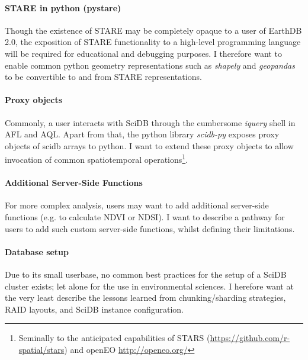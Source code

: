 \documentclass[letterpaper, parskip=half]{scrartcl}
\begin{document}
\paragraph{STARE in python (pystare)}
Though the existence of STARE may be completely opaque to a user of EarthDB 2.0, the exposition of STARE functionality to a high-level programming language will be required for educational and debugging purposes. I therefore want to enable common python geometry representations such as \textit{shapely} and \textit{geopandas} to be convertible to and from STARE representations.

\paragraph{Proxy objects}
Commonly, a user interacts with SciDB through the cumbersome \textit{iquery} shell in \gls{AFL} and \gls{AQL}. 
Apart from that, the python library \textit{scidb-py} exposes proxy objects of scidb arrays to python. 
I want to extend these proxy objects to allow invocation of common spatiotemporal operations\footnote{Seminally to the anticipated capabilities of STARS (\url{https://github.com/r-spatial/stars}) and openEO \url{http://openeo.org/}}.

\paragraph{Additional Server-Side Functions}
For more complex analysis, users may want to add additional server-side functions (e.g. to calculate \gls{NDVI} or \gls{NDSI}). I want to describe a pathway for users to add such custom server-side functions, whilst defining their limitations.

\paragraph{Database setup}
Due to its small userbase, no common best practices for the setup of a SciDB cluster exists; let alone for the use in environmental sciences. I herefore want at the very least describe the lessons learned from chunking/sharding strategies, RAID layouts, and SciDB instance configuration.



\end{document}

